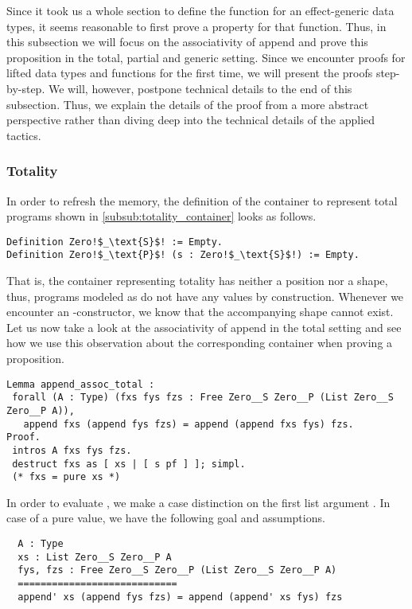 Since it took us a whole section to define the function  for an effect-generic  data types, it seems reasonable to first prove a property for that function.
Thus, in this subsection we will focus on the associativity of append and prove this proposition in the total, partial and generic setting.
Since we encounter proofs for lifted data types and functions for the first time, we will present the proofs step-by-step.
We will, however, postpone technical details to the end of this subsection.
Thus, we explain the details of the proof from a more abstract perspective rather than diving deep into the technical details of the applied tactics.

\subsubsection{Totality}
In order to refresh the memory, the definition of the container to represent total programs shown in \autoref{subsub:totality_container} looks as follows.

\begin{verbatim}
Definition Zero!$_\text{S}$! := Empty.
Definition Zero!$_\text{P}$! (s : Zero!$_\text{S}$!) := Empty.
\end{verbatim}

That is, the container representing totality has neither a position nor a shape, thus, programs modeled as  do not have any  values by construction.
Whenever we encounter an -constructor, we know that the accompanying shape  cannot exist.
Let us now take a look at the associativity of append in the total setting and see how we use this observation about the corresponding container when proving a proposition.

\begin{verbatim}
Lemma append_assoc_total :
 forall (A : Type) (fxs fys fzs : Free Zero__S Zero__P (List Zero__S Zero__P A)),
   append fxs (append fys fzs) = append (append fxs fys) fzs.
Proof.
 intros A fxs fys fzs.
 destruct fxs as [ xs | [ s pf ] ]; simpl.
 (* fxs = pure xs *)
\end{verbatim}

In order to evaluate , we make a case distinction on the first list argument .
In case of a pure value, we have the following goal and assumptions.

\begin{verbatim}
  A : Type
  xs : List Zero__S Zero__P A
  fys, fzs : Free Zero__S Zero__P (List Zero__S Zero__P A)
  ============================
  append' xs (append fys fzs) = append (append' xs fys) fzs
\end{verbatim}

